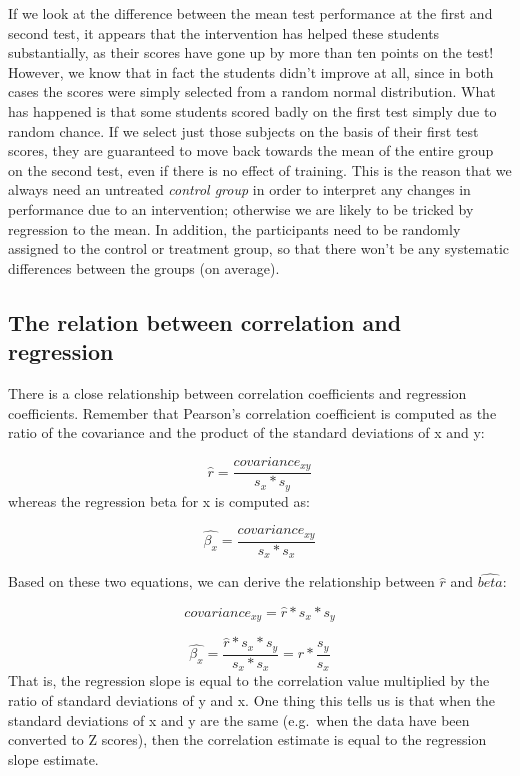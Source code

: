 \documentclass[
  12pt,
]{book}
\begin{document}
If we look at the difference between the mean test performance at the first and second test, it appears that the intervention has helped these students substantially, as their scores have gone up by more than ten points on the test! However, we know that in fact the students didn't improve at all, since in both cases the scores were simply selected from a random normal distribution. What has happened is that some students scored badly on the first test simply due to random chance. If we select just those subjects on the basis of their first test scores, they are guaranteed to move back towards the mean of the entire group on the second test, even if there is no effect of training. This is the reason that we always need an untreated \emph{control group} in order to interpret any changes in performance due to an intervention; otherwise we are likely to be tricked by regression to the mean. In addition, the participants need to be randomly assigned to the control or treatment group, so that there won't be any systematic differences between the groups (on average).

\hypertarget{the-relation-between-correlation-and-regression}{%
\subsection{The relation between correlation and regression}\label{the-relation-between-correlation-and-regression}}

There is a close relationship between correlation coefficients and regression coefficients. Remember that Pearson's correlation coefficient is computed as the ratio of the covariance and the product of the standard deviations of x and y:

\[
\hat{r} = \frac{covariance_{xy}}{s_x * s_y}
\]
whereas the regression beta for x is computed as:

\[
\hat{\beta_x} = \frac{covariance_{xy}}{s_x*s_x}
\]

Based on these two equations, we can derive the relationship between \(\hat{r}\) and \(\hat{beta}\):

\[
covariance_{xy} = \hat{r} * s_x * s_y
\]

\[
\hat{\beta_x} =  \frac{\hat{r} * s_x * s_y}{s_x * s_x} = r * \frac{s_y}{s_x}
\]
That is, the regression slope is equal to the correlation value multiplied by the ratio of standard deviations of y and x. One thing this tells us is that when the standard deviations of x and y are the same (e.g.~when the data have been converted to Z scores), then the correlation estimate is equal to the regression slope estimate.
\end{document}
